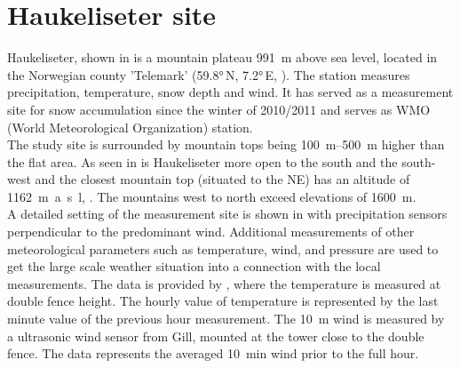\section{Haukeliseter site}\label{sec:dim:site}

Haukeliseter, shown in  is a mountain plateau \SI{991}{\m} above sea level, located in the Norwegian county 'Telemark' (\ang{59.8}\,N, \ang{7.2}\,E, ). The station measures precipitation, temperature, snow depth and wind. It has served as a measurement site for snow accumulation since the winter of 2010/2011 \citep{wolff_new_2010, wolff_measurements_2013, wolff_derivation_2015} and serves as WMO (World Meteorological Organization) station. \\
The study site is surrounded by mountain tops being \SIrange{100}{500}{\metre} higher than the flat area. As seen in  is Haukeliseter more open to the south and the south-west and the closest mountain top (situated to the NE) has an altitude of \SI{1162}{\metre a.s.l},  \citep{wolff_derivation_2015}. The mountains west to north exceed elevations of \SI{1600}{\metre}.
\\
A detailed setting of the measurement site is shown in  with precipitation sensors perpendicular to the predominant wind. Additional measurements of other meteorological parameters such as temperature, wind, and pressure are used to get the large scale weather situation into a connection with the local measurements. The data is provided by \cite{eklima_norwegian_2016}, where the temperature is measured at double fence height. The hourly value of temperature is represented by the last minute value of the previous hour measurement. The \SI{10}{\metre} wind is measured by a ultrasonic wind sensor from Gill, mounted at the tower close to the double fence. The data represents the averaged \SI{10}{\minute} wind prior to the full hour.
